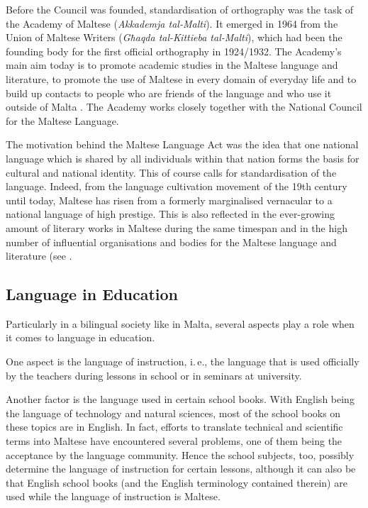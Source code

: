 \documentclass[]{../../metanetpaper}
\begin{document}
\begin{multicols}{2}
Before the Council was founded, standardisation of orthography was the task of the Academy of Maltese (\emph{Akkademja tal-Malti}). It emerged in 1964 from the Union of Maltese Writers (\emph{Għaqda tal-Kittieba tal-Malti}), which had been the founding body for the first official orthography in 1924/1932. The Academy's main aim today is to promote academic studies in the Maltese language and literature, to promote the use of Maltese in every domain of everyday life and to build up contacts to people who are friends of the language and who use it outside of Malta \cite{Akkademja1}. The Academy works closely together with the National Council for the Maltese Language.

The motivation behind the Maltese Language Act was the idea that one national language which is shared by all individuals within that nation forms the basis for cultural and national identity. This of course calls for standardisation of the language. Indeed, from the language cultivation movement of the 19th century until today, Maltese has risen from a formerly marginalised vernacular to a national language of high prestige. This is also reflected in the ever-growing amount of literary works in Maltese during the same timespan and in the high number of influential organisations and bodies for the Maltese language and literature (see \cite{Fabri:2011a}.


\subsection{Language in Education}

Particularly in a bilingual society like in Malta, several aspects play a role when it comes to language in education. 

One aspect is the language of instruction, i.\,e., the language that is used officially by the teachers during lessons in school or in seminars at university. 

Another factor is the language used in certain school books. With English being the language of technology and natural sciences, most of the school books on these topics are in English. In fact, efforts to translate technical and scientific terms into Maltese have encountered several problems, one of them being the acceptance by the language community. Hence the school subjects, too, possibly determine the language of instruction for certain lessons, although it can also be that English school books (and the English terminology contained therein) are used while the language of instruction is Maltese.


\end{multicols}
\end{document}
